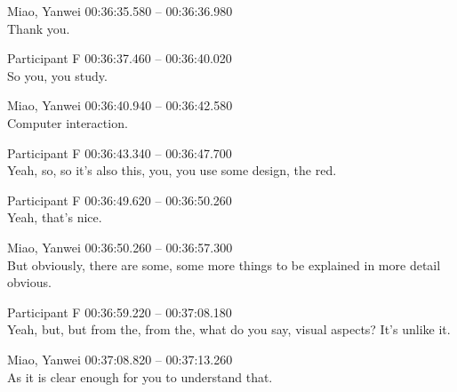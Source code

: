 {Miao, Yanwei 00:36:35.580 -- 00:36:36.980 \\
Thank you.

Participant F 00:36:37.460 -- 00:36:40.020 \\
So you, you study.

Miao, Yanwei 00:36:40.940 -- 00:36:42.580 \\
Computer interaction.

Participant F 00:36:43.340 -- 00:36:47.700 \\
Yeah, so, so it's also this, you, you use some design, the red.

Participant F 00:36:49.620 -- 00:36:50.260 \\
Yeah, that's nice.

Miao, Yanwei 00:36:50.260 -- 00:36:57.300 \\
But obviously, there are some, some more things to be explained in more detail obvious.

Participant F 00:36:59.220 -- 00:37:08.180 \\
Yeah, but, but from the, from the, what do you say, visual aspects? It's unlike it.

Miao, Yanwei 00:37:08.820 -- 00:37:13.260 \\
As it is clear enough for you to understand that.
}